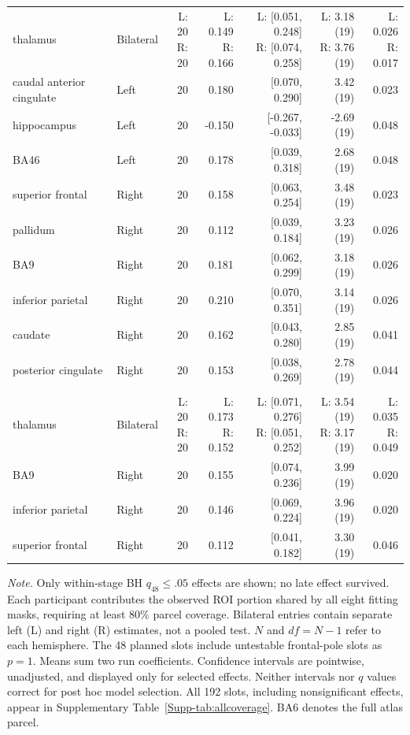 \begin{longtable}{@{}llrrrrr@{}}
thalamus & Bilateral & \shortstack[r]{L: 20\\R: 20} & \shortstack[r]{L: 0.149\\R: 0.166} & \shortstack[r]{L: [0.051, 0.248]\\R: [0.074, 0.258]} & \shortstack[r]{L: 3.18 (19)\\R: 3.76 (19)} & \shortstack[r]{L: 0.026\\R: 0.017} \\*
caudal anterior cingulate & Left & 20 & 0.180 & [0.070, 0.290] & 3.42 (19) & 0.023 \\*
hippocampus & Left & 20 & -0.150 & [-0.267, -0.033] & -2.69 (19) & 0.048 \\*
BA46 & Left & 20 & 0.178 & [0.039, 0.318] & 2.68 (19) & 0.048 \\*
superior frontal & Right & 20 & 0.158 & [0.063, 0.254] & 3.48 (19) & 0.023 \\*
pallidum & Right & 20 & 0.112 & [0.039, 0.184] & 3.23 (19) & 0.026 \\*
BA9 & Right & 20 & 0.181 & [0.062, 0.299] & 3.18 (19) & 0.026 \\*
inferior parietal & Right & 20 & 0.210 & [0.070, 0.351] & 3.14 (19) & 0.026 \\*
caudate & Right & 20 & 0.162 & [0.043, 0.280] & 2.85 (19) & 0.041 \\*
posterior cingulate & Right & 20 & 0.153 & [0.038, 0.269] & 2.78 (19) & 0.044 \\
\addlinespace
\multicolumn{7}{l}{\textbf{Middle}} \\*
thalamus & Bilateral & \shortstack[r]{L: 20\\R: 20} & \shortstack[r]{L: 0.173\\R: 0.152} & \shortstack[r]{L: [0.071, 0.276]\\R: [0.051, 0.252]} & \shortstack[r]{L: 3.54 (19)\\R: 3.17 (19)} & \shortstack[r]{L: 0.035\\R: 0.049} \\*
BA9 & Right & 20 & 0.155 & [0.074, 0.236] & 3.99 (19) & 0.020 \\*
inferior parietal & Right & 20 & 0.146 & [0.069, 0.224] & 3.96 (19) & 0.020 \\*
superior frontal & Right & 20 & 0.112 & [0.041, 0.182] & 3.30 (19) & 0.046 \\
\end{longtable}
\noindent\textit{Note.} Only within-stage BH $q_{48}\leq.05$ effects are shown; no late effect survived. Each participant contributes the observed ROI portion shared by all eight fitting masks, requiring at least 80\% parcel coverage. Bilateral entries contain separate left (L) and right (R) estimates, not a pooled test. $N$ and $df=N-1$ refer to each hemisphere. The 48 planned slots include untestable frontal-pole slots as $p=1$. Means sum two run coefficients. Confidence intervals are pointwise, unadjusted, and displayed only for selected effects. Neither intervals nor $q$ values correct for post hoc model selection. All 192 slots, including nonsignificant effects, appear in Supplementary Table~\ref{Supp-tab:allcoverage}. BA6 denotes the full atlas parcel.
\endgroup

